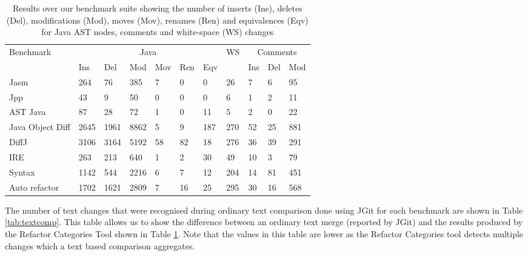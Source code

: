 \begin{table}[!p]
    \small
    \begin{tabular}{l|llllll|l|lll}
    Benchmark        & \multicolumn{6}{|c|}{Java}           & WS & \multicolumn{3}{|c}{Comments} \\ \cline{2-7} \cline{9-11}
    ~                & Ins  & Del  & Mod  & Mov & Ren & Eqv & ~          & Ins      & Del & Mod  \\ \hline
    Jasm             & 264  & 76   & 385  & 7   & 0   & 0   & 26         & 7        & 6   & 95   \\
    Jpp              & 43   & 9    & 50   & 0   & 0   & 0   & 6          & 1        & 2   & 11   \\
    AST Java         & 87   & 28   & 72   & 1   & 0   & 11  & 5          & 2        & 0   & 22   \\
    \begin{minipage}[t]{0.15\textwidth}Java Object Diff\end{minipage} & 2645 & 1961 & 8862 & 5   & 9   & 187 & 270        & 52       & 25 & 881 \\
    DiffJ            & 3106 & 3164 & 5192 & 58  & 82  & 18  & 276        & 36       & 39  & 291  \\
    IRE              & 263  & 213  & 640  & 1   & 2   & 30  & 49         & 10       & 3   & 79   \\
    Syntax           & 1142 & 544  & 2216 & 6   & 7   & 12  & 204        & 14       & 81  & 451  \\
    Auto refactor    & 1702 & 1621 & 2809 & 7   & 16  & 25  & 295        & 30       & 16  & 568  \\
    \end{tabular}
    \caption{Results over our benchmark suite showing the number of inserts (Ins), deletes (Del), modifications (Mod), moves (Mov), renames (Ren) and equivalences (Eqv) for Java AST nodes, comments and white-space (WS) changes}
    \label{tab:results}
\end{table}

The number of text changes that were recognised during ordinary text comparison done using JGit for each benchmark are shown in Table \ref{tab:textcomp}. This table allows us to show the difference between an ordinary text merge (reported by JGit) and the results produced by the Refactor Categories Tool shown in Table \ref{tab:results}. Note that the values in this table are lower as the Refactor Categories tool detects multiple changes which a text based comparison aggregates.  

